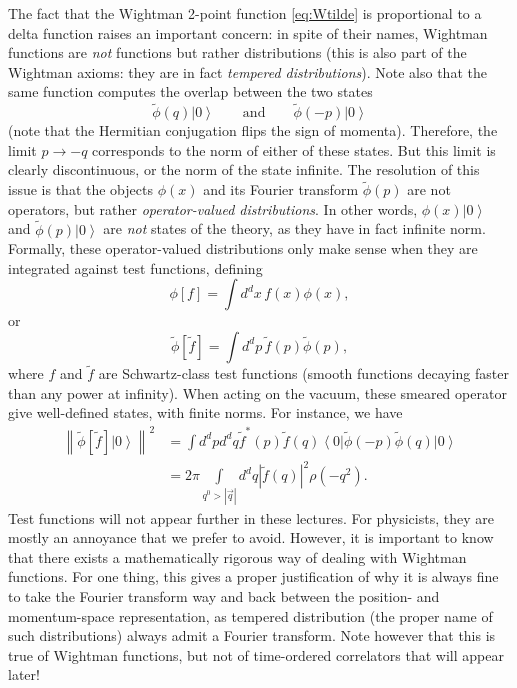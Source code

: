 \documentclass[a4paper,12pt]{article}
\newcommand{\ket}[1]{\left| #1 \right\rangle}
\newcommand{\bra}[1]{\left\langle #1 \right|}
\numberwithin{equation}{section}
\begin{document}
The fact that the Wightman 2-point function \eqref{eq:Wtilde} is proportional to a delta function raises an important concern: in spite of their names, Wightman functions are \emph{not} functions but rather distributions (this is also part of the Wightman axioms: they are in fact \emph{tempered distributions}). Note also that the same function computes the overlap between the two states 
\begin{equation}
	\widetilde{\phi}(q) \ket{0}
	\qquad\text{and}\qquad
	\widetilde{\phi}(-p) \ket{0}
\end{equation}
(note that the Hermitian conjugation flips the sign of momenta). Therefore, the limit $p \to - q$ corresponds to the norm of either of these states. But this limit is clearly discontinuous, or the norm of the state infinite.
The resolution of this issue is that the objects $\phi(x)$ and its Fourier transform $\widetilde{\phi}(p)$ are not operators, but rather \emph{operator-valued distributions}. In other words, $\phi(x) \ket{0}$
and $\widetilde{\phi}(p) \ket{0}$ are \emph{not} states of the theory, as they have in fact infinite norm. Formally, these operator-valued distributions only make sense when they are integrated against test functions, defining
\begin{equation}
	\phi[f] = \int d^dx \, f(x) \phi(x),
\end{equation}
or 
\begin{equation}
	\widetilde{\phi}[\tilde{f}] = \int d^dp \, \tilde{f}(p)
	\widetilde{\phi}(p),
\end{equation}
where $f$ and $\widetilde{f}$ are Schwartz-class test functions (smooth functions decaying faster than any power at infinity).
When acting on the vacuum, these smeared operator give well-defined states, with finite norms. For instance, we have
\begin{align}
	\left\| \widetilde{\phi}[\tilde{f}] \ket{0} \right\|^2
	&= \int d^dp d^dq \tilde{f}^*(p) \tilde{f}(q)
	\bra{0} \widetilde{\phi}(-p) \widetilde{\phi}(q) \ket{0}
	\nonumber \\
	&= 2\pi
	\int\limits_{q^0 > \left| \vec{q} \right|} \!\!
	d^dq \left| \tilde{f}(q) \right|^2
	\rho(-q^2).
	\label{eq:norm}
\end{align}
Test functions will not appear further in these lectures. For physicists, they are mostly an annoyance that we prefer to avoid. However, it is important to know that there exists a mathematically rigorous way of dealing with Wightman functions.
For one thing, this gives a proper justification of why it is always fine to take the Fourier transform way and back between the position- and momentum-space representation, as tempered distribution (the proper name of such distributions) always admit a Fourier transform.
Note however that this is true of Wightman functions, but not of time-ordered correlators that will appear later!
\end{document}
